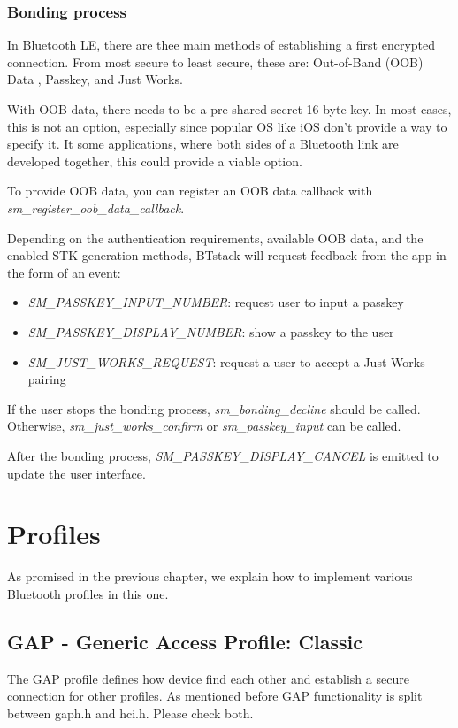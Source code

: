 \subsubsection{Bonding process}

In Bluetooth LE, there are thee main methods of establishing a first encrypted connection. From most secure to least secure, these are: Out-of-Band (OOB) Data , Passkey, and Just Works.

With OOB data, there needs to be a pre-shared secret 16 byte key. In most cases, this is not an option, especially since popular OS like iOS don't provide a way to specify it. It some applications, where both sides of a Bluetooth link are developed together, this could provide a viable option.

To provide OOB data, you can register an OOB data callback with \emph{sm\_register\_oob\_data\_callback}. 

Depending on the authentication requirements, available OOB data, and the enabled STK generation methods, BTstack will request feedback from the app in the form of an event:
\begin{itemize}
\item \emph{SM\_PASSKEY\_INPUT\_NUMBER}: request user to input a passkey
\item \emph{SM\_PASSKEY\_DISPLAY\_NUMBER}: show a passkey to the user
\item \emph{SM\_JUST\_WORKS\_REQUEST}: request a user to accept a Just Works pairing
\end{itemize}

If the user stops the bonding process, \emph{sm\_bonding\_decline} should be called. Otherwise, \emph{sm\_just\_works\_confirm} or \emph{sm\_passkey\_input} can be called.

After the bonding process, \emph{SM\_PASSKEY\_DISPLAY\_CANCEL} is emitted to update the user interface.



\section{Profiles}
As promised in the previous chapter, we explain how to implement various Bluetooth profiles in this one.


\subsection{GAP - Generic Access Profile: Classic}
The GAP profile defines how device find each other and establish a secure connection for other profiles.
As mentioned before GAP functionality is split between gaph.h and hci.h. Please check both.

